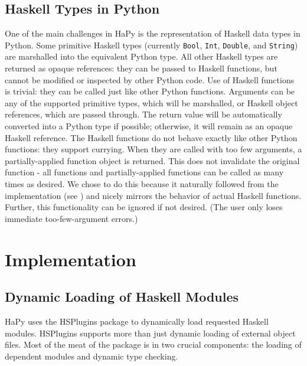 \documentclass[11pt, letterpaper, oneside, twocolumn] {article}
\begin{document}
\subsection{Haskell Types in Python}
One of the main challenges in HaPy is the representation of Haskell data types in Python.  Some primitive Haskell types (currently \verb!Bool!, \verb!Int!, \verb!Double!, and \verb!String!) are marshalled into the equivalent Python type.  All other Haskell types are returned as opaque references: they can be passed to Haskell functions, but cannot be modified or inspected by other Python code.
Use of Haskell functions is trivial: they can be called just like other Python functions.  Arguments can be any of the supported primitive types, which will be marshalled, or Haskell object references, which are passed through.  The return value will be automatically converted into a Python type if possible; otherwise, it will remain as an opaque Haskell reference.
The Haskell functions do not behave exactly like other Python functions: they support currying.  When they are called with too few arguments, a partially-applied function object is returned.  This does not invalidate the original function - all functions and partially-applied functions can be called as many times as desired.  We chose to do this because it naturally followed from the implementation (see ) and nicely mirrors the behavior of actual Haskell functions.  Further, this functionality can be ignored if not desired.  (The user only loses immediate too-few-argument errors.)

\section{Implementation}


\subsection{Dynamic Loading of Haskell Modules}

HaPy uses the HSPlugins package to dynamically load requested Haskell modules. HSPlugins supports more than just dynamic loading of external object files. Most of the meat of the package is in two crucial components: the loading of dependent modules and dynamic type checking.
\end{document}
